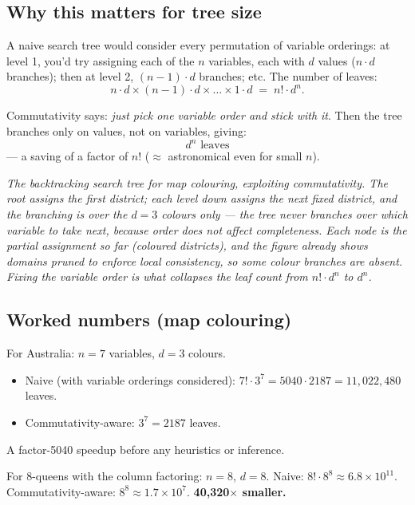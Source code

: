 \documentclass[11pt, a4paper]{article}
\begin{document}
\subsection{Why this matters for tree size}

A naive search tree would consider every permutation of variable orderings: at level 1, you'd try assigning each of the $n$ variables, each with $d$ values ($n \cdot d$ branches); then at level 2, $(n-1) \cdot d$ branches; etc. The number of leaves:
\[
n \cdot d \times (n-1) \cdot d \times \dots \times 1 \cdot d \;=\; n! \cdot d^n.
\]

Commutativity says: \emph{just pick one variable order and stick with it}. Then the tree branches only on values, not on variables, giving:
\[
d^n \text{ leaves}
\]
— a saving of a factor of $n!$ ($\approx$ astronomical even for small $n$).

\begin{center}

\footnotesize\textit{The backtracking search tree for map colouring, exploiting commutativity. The root assigns the first district; each level down assigns the \emph{next} fixed district, and the branching is over the $d{=}3$ colours only --- the tree never branches over \emph{which} variable to take next, because order does not affect completeness. Each node is the partial assignment so far (coloured districts), and the figure already shows domains pruned to enforce local consistency, so some colour branches are absent. Fixing the variable order is what collapses the leaf count from $n!\cdot d^n$ to $d^n$.}
\end{center}

\subsection{Worked numbers (map colouring)}

For Australia: $n = 7$ variables, $d = 3$ colours.

\begin{itemize}
  \item Naive (with variable orderings considered): $7! \cdot 3^7 = 5040 \cdot 2187 = 11{,}022{,}480$ leaves.
  \item Commutativity-aware: $3^7 = 2187$ leaves.
\end{itemize}

A factor-5040 speedup before any heuristics or inference.

For 8-queens with the column factoring: $n = 8$, $d = 8$. Naive: $8! \cdot 8^8 \approx 6.8 \times 10^{11}$. Commutativity-aware: $8^8 \approx 1.7 \times 10^7$. \textbf{40,320$\times$ smaller.}
\end{document}
